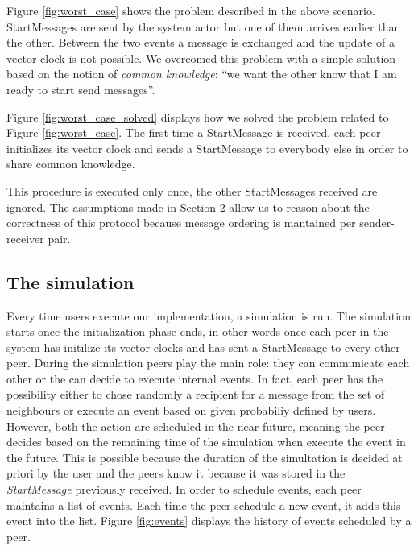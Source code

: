 \documentclass[10pt]{article}
\begin{document}
\noindent
Figure \ref{fig:worst_case} shows the problem described in the above scenario. StartMessages are sent by the system actor but one of them arrives earlier than the other. Between the two events a message is exchanged and the update of a vector clock is not possible. We overcomed this problem with a simple solution based on the notion of \textit{common knowledge}: ``we want the other know that I am ready to start send messages''.



\noindent
Figure \ref{fig:worst_case_solved} displays how we solved the problem related to Figure \ref{fig:worst_case}. The first time a StartMessage is received, each peer initializes its vector clock and sends a StartMessage to everybody else in order to share common knowledge.



\noindent
This procedure is executed only once, the other StartMessages received are ignored. The assumptions made in Section 2 allow us to reason about the correctness of this protocol because message ordering is mantained per sender-receiver pair.

\subsection{The simulation}

Every time users execute our implementation, a simulation is run. The simulation starts once the initialization phase ends, in other words once each peer in the system has initilize its vector clocks and has sent a StartMessage to every other peer. During the simulation peers play the main role: they can communicate each other or the can decide to execute internal events. In fact, each peer has the possibility either to chose randomly a recipient for a message from the set of neighbours or execute an event based on given probabiliy defined by users. However, both the action are scheduled in the near future, meaning the peer decides based on the remaining time of the simulation when execute the event in the future. This is possible because the duration of the simultation is decided at priori by the user and the peers know it because it was stored in the \textit{StartMessage} previously received. In order to schedule events, each peer maintains a list of events. Each time the peer schedule a new event, it adds this event into the list. Figure \ref{fig:events} displays the history of events scheduled by a peer.
\end{document}
